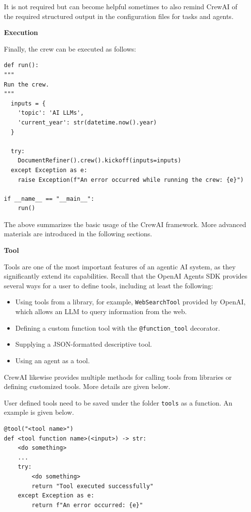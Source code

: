 It is not required but can become helpful sometimes to also remind CrewAI of the required structured output in the configuration files for tasks and agents.

\vspace{0.1in}
\noindent \textbf{Execution}
\vspace{0.1in}

Finally, the crew can be executed as follows:
\begin{lstlisting}
def run():
"""
Run the crew.
"""
  inputs = {
	'topic': 'AI LLMs',
	'current_year': str(datetime.now().year)
  }

  try:
    DocumentRefiner().crew().kickoff(inputs=inputs)
  except Exception as e:
    raise Exception(f"An error occurred while running the crew: {e}")

if __name__ == "__main__":
	run()
\end{lstlisting}

The above summarizes the basic usage of the CrewAI framework. More advanced materials are introduced in the following sections.

\vspace{0.1in}
\noindent \textbf{Tool}
\vspace{0.1in}

Tools are one of the most important features of an agentic AI system, as they significantly extend its capabilities. Recall that the OpenAI Agents SDK provides several ways for a user to define tools, including at least the following:
\begin{itemize}
	\item Using tools from a library, for example, \verb|WebSearchTool| provided by OpenAI, which allows an LLM to query information from the web.
	\item Defining a custom function tool with the \verb|@function_tool| decorator.
	\item Supplying a JSON-formatted descriptive tool.
	\item Using an agent as a tool.
\end{itemize}

CrewAI likewise provides multiple methods for calling tools from libraries or defining customized tools. More details are given below.

User defined tools need to be saved under the folder \texttt{tools} as a function. An example is given below.
\begin{lstlisting}
@tool("<tool name>")
def <tool function name>(<input>) -> str:
    <do something>
    ...
    try:
        <do something>
        return "Tool executed successfully"
    except Exception as e:
        return f"An error occurred: {e}"
\end{lstlisting}

